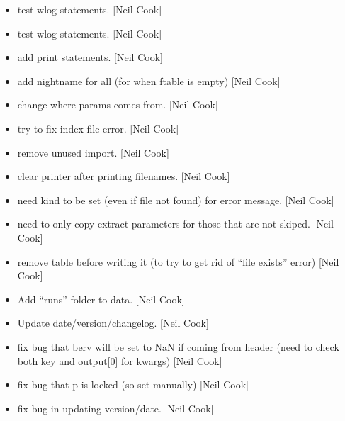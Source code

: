 \documentclass[a4paper,10pt,english]{report}
\begin{document}
\begin{itemize}
\item {} 
 \sphinxhyphen{} test wlog statements. {[}Neil Cook{]}

\item {} 
 \sphinxhyphen{} test wlog statements. {[}Neil Cook{]}

\item {} 
 \sphinxhyphen{} add print statements. {[}Neil Cook{]}

\item {} 
 \sphinxhyphen{} add nightname for all (for when
ftable is empty) {[}Neil Cook{]}

\item {} 
 \sphinxhyphen{} change where params comes
from. {[}Neil Cook{]}

\item {} 
 \sphinxhyphen{} try to fix index file error. {[}Neil Cook{]}

\item {} 
 \sphinxhyphen{} remove unused import. {[}Neil Cook{]}

\item {} 
 \sphinxhyphen{} clear printer after printing filenames.
{[}Neil Cook{]}

\item {} 
 \sphinxhyphen{} need kind to be set (even if
file not found) for error message. {[}Neil Cook{]}

\item {} 
 \sphinxhyphen{} need to only copy extract parameters for
those that are not skiped. {[}Neil Cook{]}

\item {} 
 \sphinxhyphen{} remove table before writing it (to try to get rid of
“file exists” error) {[}Neil Cook{]}

\item {} 
Add “runs” folder to data. {[}Neil Cook{]}

\item {} 
Update date/version/changelog. {[}Neil Cook{]}

\item {} 
 \sphinxhyphen{} fix bug that berv will be set to NaN if
coming from header (need to check both key and output{[}0{]} for kwargs)
{[}Neil Cook{]}

\item {} 
 \sphinxhyphen{} fix bug that p is locked
(so set manually) {[}Neil Cook{]}

\item {} 
 \sphinxhyphen{} fix bug in updating version/date. {[}Neil Cook{]}

\end{itemize}
\end{document}
